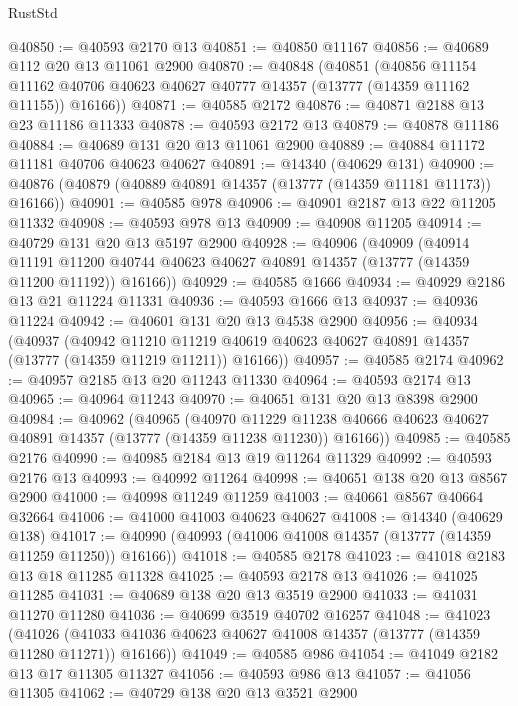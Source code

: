 \begin{lexlean}{RustStd}
\begin{coremodule}
@40850 := @40593 @2170 @13
@40851 := @40850 @11167
@40856 := @40689 @112 @20 @13 @11061 @2900
@40870 := @40848
    (@40851
      (@40856
        @11154
        @11162
        @40706
        @40623
        @40627
        @40777
        @14357
        (@13777 (@14359 @11162 @11155))
        @16166))
@40871 := @40585 @2172
@40876 := @40871 @2188 @13 @23 @11186 @11333
@40878 := @40593 @2172 @13
@40879 := @40878 @11186
@40884 := @40689 @131 @20 @13 @11061 @2900
@40889 := @40884 @11172 @11181 @40706 @40623 @40627
@40891 := @14340 (@40629 @131)
@40900 := @40876 (@40879 (@40889 @40891 @14357 (@13777 (@14359 @11181 @11173)) @16166))
@40901 := @40585 @978
@40906 := @40901 @2187 @13 @22 @11205 @11332
@40908 := @40593 @978 @13
@40909 := @40908 @11205
@40914 := @40729 @131 @20 @13 @5197 @2900
@40928 := @40906
    (@40909
      (@40914
        @11191
        @11200
        @40744
        @40623
        @40627
        @40891
        @14357
        (@13777 (@14359 @11200 @11192))
        @16166))
@40929 := @40585 @1666
@40934 := @40929 @2186 @13 @21 @11224 @11331
@40936 := @40593 @1666 @13
@40937 := @40936 @11224
@40942 := @40601 @131 @20 @13 @4538 @2900
@40956 := @40934
    (@40937
      (@40942
        @11210
        @11219
        @40619
        @40623
        @40627
        @40891
        @14357
        (@13777 (@14359 @11219 @11211))
        @16166))
@40957 := @40585 @2174
@40962 := @40957 @2185 @13 @20 @11243 @11330
@40964 := @40593 @2174 @13
@40965 := @40964 @11243
@40970 := @40651 @131 @20 @13 @8398 @2900
@40984 := @40962
    (@40965
      (@40970
        @11229
        @11238
        @40666
        @40623
        @40627
        @40891
        @14357
        (@13777 (@14359 @11238 @11230))
        @16166))
@40985 := @40585 @2176
@40990 := @40985 @2184 @13 @19 @11264 @11329
@40992 := @40593 @2176 @13
@40993 := @40992 @11264
@40998 := @40651 @138 @20 @13 @8567 @2900
@41000 := @40998 @11249 @11259
@41003 := @40661 @8567 @40664 @32664
@41006 := @41000 @41003 @40623 @40627
@41008 := @14340 (@40629 @138)
@41017 := @40990 (@40993 (@41006 @41008 @14357 (@13777 (@14359 @11259 @11250)) @16166))
@41018 := @40585 @2178
@41023 := @41018 @2183 @13 @18 @11285 @11328
@41025 := @40593 @2178 @13
@41026 := @41025 @11285
@41031 := @40689 @138 @20 @13 @3519 @2900
@41033 := @41031 @11270 @11280
@41036 := @40699 @3519 @40702 @16257
@41048 := @41023
    (@41026 (@41033 @41036 @40623 @40627 @41008 @14357 (@13777 (@14359 @11280 @11271)) @16166))
@41049 := @40585 @986
@41054 := @41049 @2182 @13 @17 @11305 @11327
@41056 := @40593 @986 @13
@41057 := @41056 @11305
@41062 := @40729 @138 @20 @13 @3521 @2900

\end{coremodule}
\end{lexlean}
